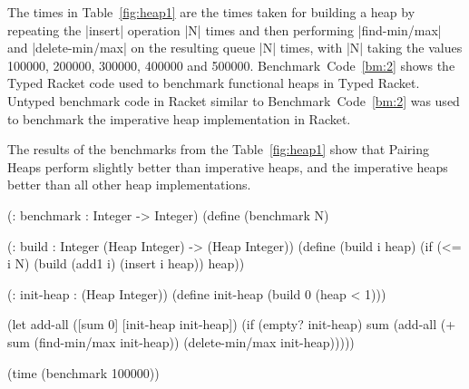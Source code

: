 The times in Table~\ref{fig:heap1} are the times taken for building a
heap by repeating the \scheme|insert| operation \scheme|N| times and
then performing \scheme|find-min/max| and \scheme|delete-min/max| on the
resulting queue \scheme|N| times, with \scheme|N| taking the values
100000, 200000, 300000, 400000 and 500000. Benchmark~Code~\ref{bm:2}
shows the Typed Racket code used to benchmark functional heaps in Typed
Racket. Untyped benchmark code in Racket similar to
Benchmark~Code~\ref{bm:2} was used to benchmark the imperative heap
implementation in Racket.

The results of the benchmarks from the Table~\ref{fig:heap1} show that
Pairing Heaps perform slightly better than imperative heaps, and the
imperative heaps better than all other heap implementations.

\begin{benchmark}
 \begin{schemedisplay}
  (: benchmark : Integer -> Integer)
  (define (benchmark N)
   
    (: build : Integer (Heap Integer) -> (Heap Integer))
    (define (build i heap)
      (if (<= i N)
          (build (add1 i) (insert i heap))
          heap))

    (: init-heap : (Heap Integer))
    (define init-heap (build 0 (heap < 1)))

    (let add-all ([sum 0] [init-heap init-heap])
      (if (empty? init-heap)
          sum
          (add-all (+ sum (find-min/max init-heap))
                (delete-min/max init-heap)))))

  (time (benchmark 100000))
 \end{schemedisplay}
 \label{bm:2}
\end{benchmark}


